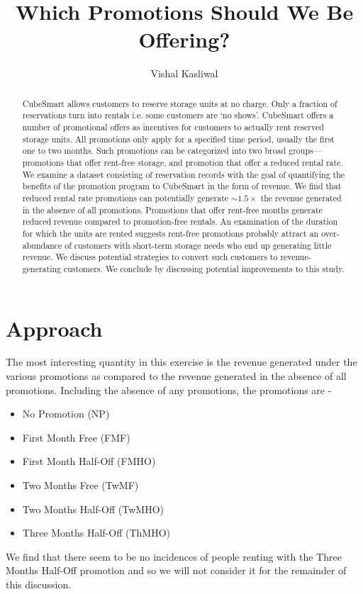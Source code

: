 \documentclass[times]{aastex6}
\begin{document}
\title{Which Promotions Should We Be Offering?}

\author {Vishal Kasliwal}

\begin{abstract}

CubeSmart allows customers to reserve storage units at no charge. Only a fraction of reservations turn into rentals i.e. some customers are `no shows'. CubeSmart offers a number of promotional offers as incentives for customers to actually rent reserved storage units. All promotions only apply for a specified time period, usually the first one to two months. Such promotions can be categorized into two broad groups---promotions that offer rent-free storage, and promotion that offer a reduced rental rate. We examine a dataset consisting of reservation records with the goal of quantifying the benefits of the promotion program to CubeSmart in the form of revenue. We find that reduced rental rate promotions can potentially generate $\sim 1.5 \times$ the revenue generated in the absence of all promotions. Promotions that offer rent-free months generate reduced revenue compared to promotion-free rentals. An examination of the duration for which the units are rented suggests rent-free promotions probably attract an over-abundance of customers with short-term storage needs who end up generating little revenue. We discuss potential strategies to convert such customers to revenue-generating customers. We conclude by discussing potential improvements to this study.

\end{abstract}

\section{Approach}\label{sec:Approach}

The most interesting quantity in this exercise is the revenue generated under the various promotions as compared to the revenue generated in the absence of all promotions. Including the absence of any promotions, the promotions are -
\begin{itemize}
    \item No Promotion (NP)
    \item First Month Free (FMF)
    \item First Month Half-Off (FMHO)
    \item Two Months Free (TwMF)
    \item Two Months Half-Off (TwMHO)
    \item Three Months Half-Off (ThMHO)
\end{itemize}
We find that there seem to be no incidences of people renting with the Three Months Half-Off promotion and so we will not consider it for the remainder of this discussion.
\end{document}
